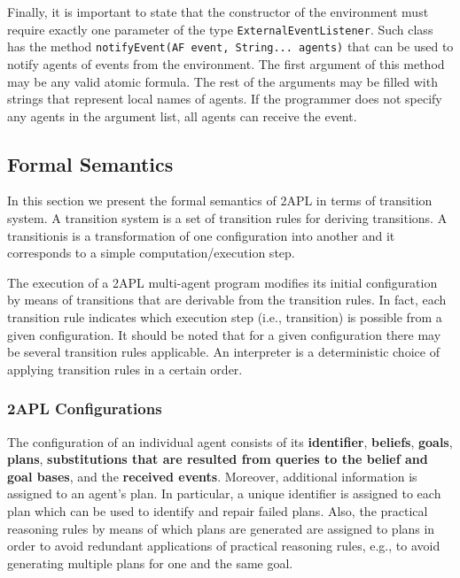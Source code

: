\documentclass[a4paper]{article}
\begin{document}
Finally, it is important to state that the constructor of the environment must require exactly one parameter of the type \texttt{ExternalEventListener}. Such class has the method \texttt{notifyEvent(AF event, String... agents)} that can be used to notify agents of events from the environment. The first argument of this method may be any valid atomic formula. The rest of the arguments may be filled with strings that represent local names of agents. If the programmer does not specify any agents in the argument list, all agents can receive the event. 

\subsection{Formal Semantics} %

In this section we present the formal semantics of 2APL in terms of transition system. A transition system is a set of transition rules for deriving transitions. A transitionis is a transformation of one configuration into another and it corresponds to a simple computation/execution step.

The execution of a 2APL multi-agent program modiﬁes its initial conﬁguration by means of transitions that are derivable from the transition rules. In fact, each transition rule indicates which execution step (i.e., transition) is possible from a given conﬁguration. It should be noted that for a given conﬁguration there may be
several transition rules applicable. An interpreter is a deterministic choice of applying transition rules in a certain order.

\subsubsection{2APL Configurations}

The conﬁguration of an individual agent consists of its \textbf{identiﬁer}, \textbf{beliefs}, \textbf{goals}, \textbf{plans}, \textbf{substitutions that are resulted from queries to the belief and goal bases}, and the \textbf{received events}. Moreover, additional information is assigned to an agent's plan. In particular, a unique identiﬁer is assigned to each plan which can be used to identify and repair failed plans. Also, the practical reasoning rules by means of which plans are generated are assigned to plans in order to avoid redundant applications of practical reasoning rules, e.g., to avoid generating multiple plans for one and the same goal.
\end{document}
